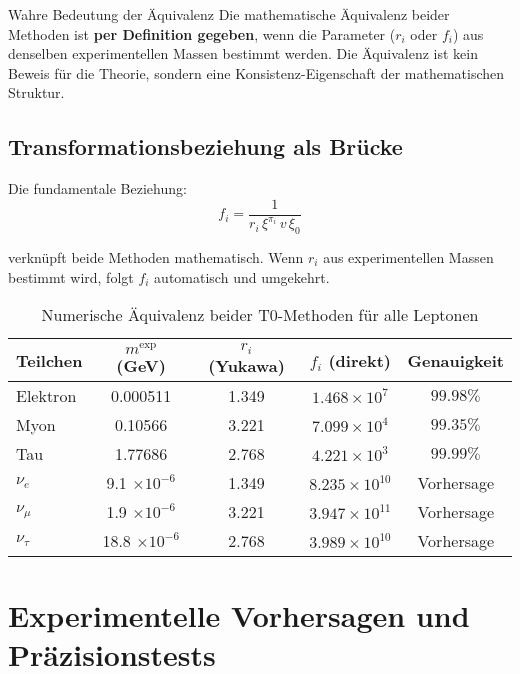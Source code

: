 \documentclass[12pt,a4paper]{article}
\begin{document}
	\begin{schluessel}{Wahre Bedeutung der Äquivalenz}{}
		Die mathematische Äquivalenz beider Methoden ist \textbf{per Definition gegeben}, wenn die Parameter ($r_i$ oder $f_i$) aus denselben experimentellen Massen bestimmt werden. Die Äquivalenz ist kein Beweis für die Theorie, sondern eine Konsistenz-Eigenschaft der mathematischen Struktur.
	\end{schluessel}
	
	\subsection{Transformationsbeziehung als Brücke}
	\label{subsec:transformationsbeziehung}
	
	Die fundamentale Beziehung:
	\begin{equation}
		f_i = \frac{1}{r_i \, \xi^{\pi_i} \, v \, \xi_0}
		\label{eq:transformation_bridge}
	\end{equation}
	
	verknüpft beide Methoden mathematisch. Wenn $r_i$ aus experimentellen Massen bestimmt wird, folgt $f_i$ automatisch und umgekehrt.
	
	\begin{table}[H]
		\centering
		\begin{tabular}{lcccc}
			\toprule
			\textbf{Teilchen} & \textbf{$m^{\text{exp}}$ (GeV)} & \textbf{$r_i$ (Yukawa)} & \textbf{$f_i$ (direkt)} & \textbf{Genauigkeit} \\
			\midrule
			Elektron & 0.000511 & 1.349 & $1.468 \times 10^{7}$ & $99.98\%$ \\
			Myon & 0.10566 & 3.221 & $7.099 \times 10^{4}$ & $99.35\%$ \\
			Tau & 1.77686 & 2.768 & $4.221 \times 10^{3}$ & $99.99\%$ \\
			\midrule
			$\nu_e$ & 9.1 $\times 10^{-6}$ & 1.349 & $8.235 \times 10^{10}$ & Vorhersage \\
			$\nu_\mu$ & 1.9 $\times 10^{-6}$ & 3.221 & $3.947 \times 10^{11}$ & Vorhersage \\
			$\nu_\tau$ & 18.8 $\times 10^{-6}$ & 2.768 & $3.989 \times 10^{10}$ & Vorhersage \\
			\bottomrule
		\end{tabular}
		\caption{Numerische Äquivalenz beider T0-Methoden für alle Leptonen}
		\label{tab:numerische_aequivalenz_komplett}
	\end{table}
	
	\section{Experimentelle Vorhersagen und Präzisionstests}
	\label{sec:experimentelle_vorhersagen}
	
\end{document}
